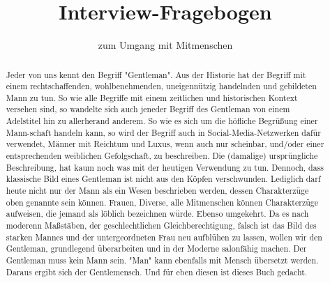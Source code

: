 \documentclass[a4paper,12pt]{scrartcl}
\begin{document}
\title{Interview-Fragebogen}
\author{zum Umgang mit Mitmenschen}
\date{}
\maketitle

\begin{abstract}
    Jeder von uns kennt den Begriff "Gentleman". Aus der Historie hat der Begriff mit einem rechtschaffenden, wohlbenehmenden, 
    uneigennützig handelnden und gebildeten Mann zu tun. So wie alle Begriffe mit einem zeitlichen und historischen Kontext
    versehen sind, so wandelte sich auch jeneder Begriff des Gentleman von einem Adelstitel hin zu allerherand anderem.
    So wie es sich um die höfliche Begrüßung einer Mann-schaft handeln kann, so wird der Begriff auch in Social-Media-Netzwerken
    dafür verwendet, Männer mit Reichtum und Luxus, wenn auch nur scheinbar, und/oder einer entsprechenden weiblichen Gefolgschaft,
    zu beschreiben. Die (damalige) ursprüngliche Beschreibung, hat kaum noch was mit der heutigen Verwendung zu tun.
    Dennoch, dass klassische Bild eines Gentleman ist nicht aus den Köpfen verschwunden. Lediglich darf heute nicht nur der
    Mann als ein Wesen beschrieben werden, dessen Charakterzüge oben genannte sein können. Frauen, Diverse, alle Mitmenschen
    können Charakterzüge aufweisen, die jemand als löblich bezeichnen würde. Ebenso umgekehrt.
    Da es nach moderenn Maßstäben, der geschlechtlichen Gleichberechtigung, falsch ist das Bild des starken Mannes und der 
    untergeordneten Frau neu aufblühen zu lassen, wollen wir den Gentleman, grundlegend überarbeiten 
    und in der Moderne salonfähig machen. Der Gentleman muss kein Mann sein. "Man" kann ebenfalls mit Mensch übersetzt werden.
    Daraus ergibt sich der Gentlemensch. Und für eben diesen ist dieses Buch gedacht.
    \\ 
    \\ 
    

\end{abstract}
\end{document}
